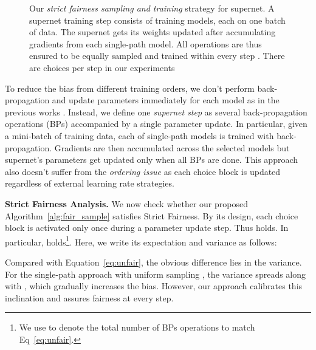 \documentclass[10pt,twocolumn,letterpaper]{article}
\theoremstyle{definition}
\begin{document}
\begin{figure*}[ht]
\caption[]{Our \emph{strict fairness sampling and training} strategy for supernet. A supernet training step  consists of training  models, each on one batch of data.  The supernet gets its weights updated after accumulating gradients from each single-path model. All operations are thus ensured to be equally sampled and trained within every step . There are   choices per step in our experiments\footnotemark} \label{fig:one-shot-strategy}
\end{figure*}

To reduce the bias from different training orders, we don't perform back-propagation and update parameters immediately for each model as in the previous works \cite{bender2018understanding,guo2019single}. Instead, we define one \emph{supernet step} as several back-propagation operations (BPs) accompanied by a single parameter update. In particular, given a mini-batch of training data, each of  single-path models is trained with back-propagation. Gradients are then accumulated across the selected  models but supernet's parameters get updated only when all  BPs are done.  This approach also doesn't suffer from the \emph{ordering issue} as each choice block is updated regardless of external learning rate strategies.


\textbf{Strict Fairness Analysis.}
We now check whether our proposed Algorithm~\ref{alg:fair_sample} satisfies Strict Fairness. By its design, each choice block is activated only once during a parameter update step. Thus  holds. In particular,  holds\footnote{We use  to denote the total number of BPs operations to match Eq~\ref{eq:unfair}.}. Here, we write its expectation and variance as follows:

Compared with Equation~\ref{eq:unfair}, the obvious difference lies in the variance. For the single-path approach with uniform sampling \cite{guo2019single}, the variance spreads along with , which gradually increases the bias. However, our approach calibrates this inclination and assures fairness at every step.
\end{document}
